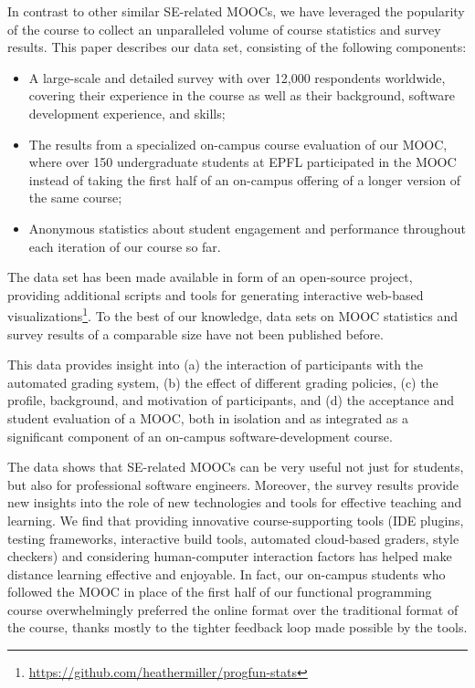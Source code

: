 \documentclass{sig-alternate}
\begin{document}
In contrast to other similar SE-related MOOCs, we have leveraged the popularity of the course to collect an unparalleled volume of course statistics and survey results. This paper describes our data set, consisting of the following components:

\begin{itemize}
\item A large-scale and detailed survey with over 12,000 respondents worldwide, covering their experience in the course as well as their background, software development experience, and skills;
\item The results from a specialized on-campus course evaluation of our MOOC, where over 150 undergraduate students at EPFL participated in the MOOC instead of taking the first half of an on-campus offering of a longer version of the same course;
\item Anonymous statistics about student engagement and performance throughout each iteration of our course so far.
\end{itemize}

The data set has been made available in form of an open-source project, providing additional scripts and tools for generating interactive web-based visualizations\footnote{\url{https://github.com/heathermiller/progfun-stats}}. To the best of our knowledge, data sets on MOOC statistics and survey results of a comparable size have not been published   before.

This data provides insight into (a) the interaction of participants with the automated grading system, (b) the effect of different grading policies, (c) the profile, background, and motivation of participants, and (d) the acceptance and student evaluation of a MOOC, both in isolation and as integrated as a significant component of an on-campus software-development course.

The data shows that SE-related MOOCs can be very useful not just for students, but
  also for professional software engineers.
  Moreover, the survey results provide new insights into the role of new technologies and tools
  for effective teaching and learning. We find that providing innovative course-supporting tools (IDE plugins, testing frameworks, interactive build tools, automated cloud-based graders, style checkers) and considering human-computer interaction factors has helped make distance learning effective and enjoyable. In fact, our on-campus students who followed the MOOC in place of the first half of our functional programming course overwhelmingly preferred the online format over the traditional format of the course, thanks mostly to the tighter feedback loop made possible by the tools.
\end{document}

